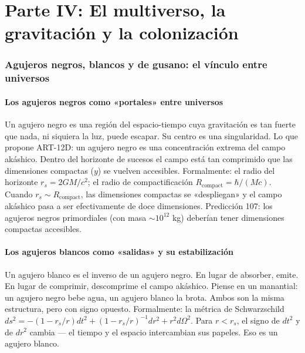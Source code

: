 \part*{Parte IV: El multiverso, la gravitación y la colonización}

\section{Agujeros negros, blancos y de gusano: el vínculo entre universos}
\subsection{Los agujeros negros como «portales» entre universos}
Un agujero negro es una región del espacio-tiempo cuya gravitación es tan fuerte que nada, ni siquiera la luz, puede escapar. Su centro es una singularidad. Lo que propone ART-12D: un agujero negro es una concentración extrema del campo akáshico. Dentro del horizonte de sucesos el campo está tan comprimido que las dimensiones compactas ($y$) se vuelven accesibles. Formalmente: el radio del horizonte $r_s = 2GM/c^2$; el radio de compactificación $R_{\text{compact}} = \hbar/(Mc)$. Cuando $r_s \sim R_{\text{compact}}$, las dimensiones compactas se «despliegan» y el campo akáshico pasa a ser efectivamente de doce dimensiones. Predicción 107: los agujeros negros primordiales (con masa $\sim 10^{12}$ kg) deberían tener dimensiones compactas accesibles.

\subsection{Los agujeros blancos como «salidas» y su estabilización}
Un agujero blanco es el inverso de un agujero negro. En lugar de absorber, emite. En lugar de comprimir, descomprime el campo akáshico. Piense en un manantial: un agujero negro bebe agua, un agujero blanco la brota. Ambos son la misma estructura, pero con signo opuesto. Formalmente: la métrica de Schwarzschild $ds^2 = -(1-r_s/r)dt^2 + (1-r_s/r)^{-1}dr^2 + r^2 d\Omega^2$. Para $r < r_s$, el signo de $dt^2$ y de $dr^2$ cambia --- el tiempo y el espacio intercambian sus papeles. Eso es un agujero blanco.

